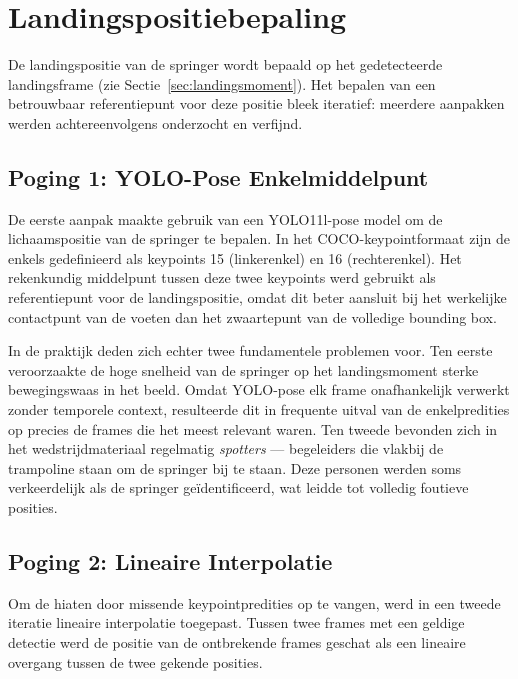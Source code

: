 
\section{Landingspositiebepaling}
\label{sec:landingspositie}

De landingspositie van de springer wordt bepaald op het gedetecteerde landingsframe (zie Sectie~\ref{sec:landingsmoment}). Het bepalen van een betrouwbaar referentiepunt voor deze positie bleek iteratief: meerdere aanpakken werden achtereenvolgens onderzocht en verfijnd.

\subsection{Poging 1: YOLO-Pose Enkelmiddelpunt}
\label{subsec:landingspositie-yolo}

De eerste aanpak maakte gebruik van een YOLO11l-pose model \autocite{Jocher_Ultralytics_YOLO_2023} om de lichaamspositie van de springer te bepalen. In het COCO-keypointformaat zijn de enkels gedefinieerd als keypoints 15 (linkerenkel) en 16 (rechterenkel). Het rekenkundig middelpunt tussen deze twee keypoints werd gebruikt als referentiepunt voor de landingspositie, omdat dit beter aansluit bij het werkelijke contactpunt van de voeten dan het zwaartepunt van de volledige bounding box.

In de praktijk deden zich echter twee fundamentele problemen voor. Ten eerste veroorzaakte de hoge snelheid van de springer op het landingsmoment sterke bewegingswaas in het beeld. Omdat YOLO-pose elk frame onafhankelijk verwerkt zonder temporele context, resulteerde dit in frequente uitval van de enkelpredities op precies de frames die het meest relevant waren. Ten tweede bevonden zich in het wedstrijdmateriaal regelmatig \textit{spotters} — begeleiders die vlakbij de trampoline staan om de springer bij te staan. Deze personen werden soms verkeerdelijk als de springer geïdentificeerd, wat leidde tot volledig foutieve posities.

\subsection{Poging 2: Lineaire Interpolatie}
\label{subsec:landingspositie-interpolatie}

Om de hiaten door missende keypointpredities op te vangen, werd in een tweede iteratie lineaire interpolatie toegepast. Tussen twee frames met een geldige detectie werd de positie van de ontbrekende frames geschat als een lineaire overgang tussen de twee gekende posities.

